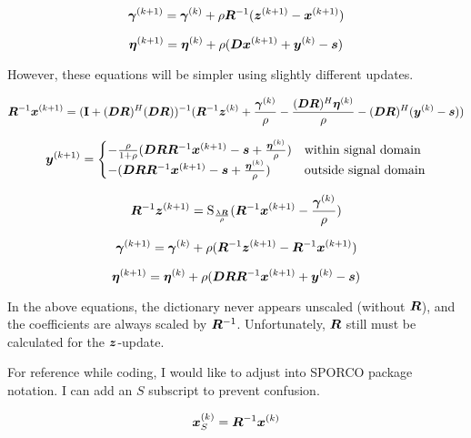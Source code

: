 \documentclass{article}
\begin{document}
\begin{equation}
\bm{\gamma}^{(k + 1)} = \bm{\gamma}^{(k)} + \rho\bm{R}^{-1}(\bm{z}^{(k + 1)} - \bm{x}^{(k + 1)})
\end{equation}

\begin{equation}
\bm{\eta}^{(k + 1)} = \bm{\eta}^{(k)} + \rho(\bm{D}\bm{x}^{(k + 1)} + \bm{y}^{(k)} - \bm{s})
\end{equation}

However, these equations will be simpler using slightly different updates.

\begin{equation}
\bm{R}^{-1}\bm{x}^{(k + 1)} = ({\bf I} + (\bm{D}\bm{R})^H(\bm{D}\bm{R}))^{-1}(\bm{R}^{-1}\bm{z}^{(k)} + \frac{\bm{\gamma}^{(k)}}{\rho} - \frac{(\bm{D}\bm{R})^H\bm{\eta}^{(k)}}{\rho} - (\bm{D}\bm{R})^H(\bm{y}^{(k)} - \bm{s}))
\end{equation}

\begin{equation}
\bm{y}^{(k + 1)}= \begin{cases}
-\frac{\rho}{1 + \rho}(\bm{D}\bm{R}\bm{R}^{-1}\bm{x}^{(k + 1)} - \bm{s}  + \frac{\bm{\eta}^{(k)}}{\rho}) & \text{within signal domain}\\
-(\bm{D}\bm{R}\bm{R}^{-1}\bm{x}^{(k + 1)} - \bm{s}  + \frac{\bm{\eta}^{(k)}}{\rho}) & \text{outside signal domain}
\end{cases}
\end{equation}

\begin{equation}
\bm{R}^{-1}\bm{z}^{(k + 1)}= \operatorname{S}_{\frac{\lambda\bm{R}}{\rho}}(\bm{R}^{-1}\bm{x}^{(k+1)} - \frac{\bm{\gamma}^{(k)}}{\rho})
\end{equation}

\begin{equation}
\bm{\gamma}^{(k + 1)} = \bm{\gamma}^{(k)} + \rho(\bm{R}^{-1}\bm{z}^{(k + 1)} - \bm{R}^{-1}\bm{x}^{(k + 1)})
\end{equation}

\begin{equation}
\bm{\eta}^{(k + 1)} = \bm{\eta}^{(k)} + \rho(\bm{D}\bm{R}\bm{R}^{-1}\bm{x}^{(k + 1)} + \bm{y}^{(k)} - \bm{s})
\end{equation}


In the above equations, the dictionary never appears unscaled (without $\bm{R}$), and the coefficients are always scaled by $\bm{R}^{-1}$. Unfortunately,  $\bm{R}$ still must be calculated for the $\bm{z}$-update.

For reference while coding, I would like to adjust into SPORCO package notation. I can add an $S$ subscript to prevent confusion.

\begin{equation}
\bm{x}_S^{(k)} = \bm{R}^{-1}\bm{x}^{(k)}
\end{equation}
\end{document}
